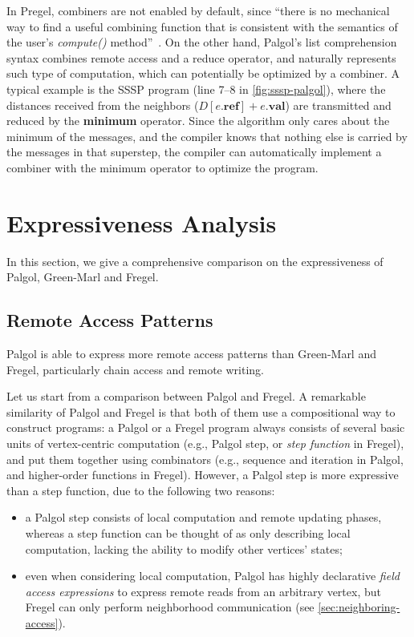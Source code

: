 \documentclass{sokendai_thesis} %
\begin{document}
In Pregel, combiners are not enabled by default, since ``there is no mechanical way to find a useful combining function that is consistent with the semantics of the user's \emph{compute()} method''~\cite{pregel}. %
On the other hand, Palgol's list comprehension syntax combines remote access and a reduce operator, and naturally represents such type of computation, which can potentially be optimized by a combiner.
A typical example is the SSSP program (line 7--8 in \autoref{fig:sssp-palgol}), where the distances received from the neighbors ($D[e.\mathbf{ref}]+e.\mathbf{val}$) are transmitted and reduced by the \textbf{minimum} operator.
Since the algorithm only cares about the minimum of the messages, and the compiler knows that nothing else is carried by the messages in that superstep, the compiler can automatically implement a combiner with the minimum operator to optimize the program.

\chapter{Expressiveness Analysis}
\label{sec:expressiveness}

In this section, we give a comprehensive comparison on the expressiveness of Palgol, Green-Marl and Fregel.

\section{Remote Access Patterns}

Palgol is able to express more remote access patterns than Green-Marl and Fregel, particularly chain access and remote writing.

Let us start from a comparison between Palgol and Fregel.
A remarkable similarity of Palgol and Fregel is that both of them use a compositional way to construct programs:
a Palgol or a Fregel program always consists of several basic units of vertex-centric computation (e.g., Palgol step, or \emph{step function} in Fregel), and put them together using combinators (e.g., sequence and iteration in Palgol, and higher-order functions in Fregel).
However, a Palgol step is more expressive than a step function, due to the following two reasons:
\begin{itemize}\setlength\itemsep{0em}
 \item a Palgol step consists of local computation and remote updating phases, whereas a step function can be thought of as only describing local computation, lacking the ability to modify other vertices' states;
 \item even when considering local computation, Palgol has highly declarative \textit{field access expressions} to express remote reads from an arbitrary vertex, but Fregel can only perform neighborhood communication (see \autoref{sec:neighboring-access}).
\end{itemize}
\end{document}
